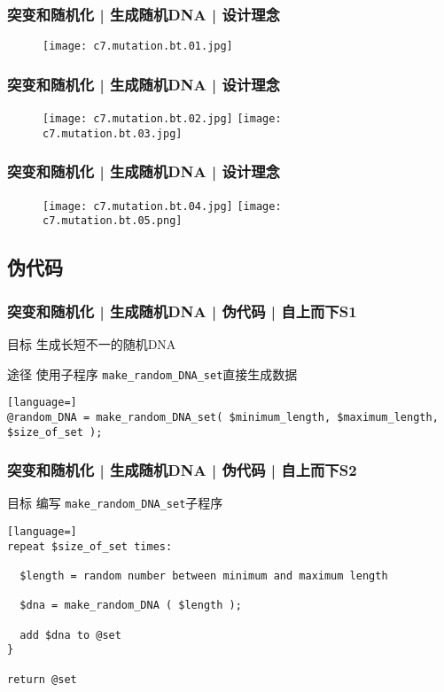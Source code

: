\begin{frame}
  \frametitle{突变和随机化 | 生成随机DNA | 设计理念}
  \begin{figure}
    \centering
    \texttt{[image: c7.mutation.bt.01.jpg]}
  \end{figure}
\end{frame}

\begin{frame}
  \frametitle{突变和随机化 | 生成随机DNA | 设计理念}
  \begin{figure}
    \centering
    \texttt{[image: c7.mutation.bt.02.jpg]}
    \texttt{[image: c7.mutation.bt.03.jpg]}
  \end{figure}
\end{frame}

\begin{frame}
  \frametitle{突变和随机化 | 生成随机DNA | 设计理念}
  \begin{figure}
    \centering
    \texttt{[image: c7.mutation.bt.04.jpg]}
    \texttt{[image: c7.mutation.bt.05.png]}
  \end{figure}
\end{frame}

\subsection{伪代码}
\begin{frame}[fragile]
  \frametitle{突变和随机化 | 生成随机DNA | 伪代码 | 自上而下S1}
  \begin{block}{目标}
    生成长短不一的随机DNA
  \end{block}
  \pause
  \begin{block}{途径}
  使用子程序 \verb|make_random_DNA_set|直接生成数据
  \end{block}
  \pause
\begin{lstlisting}[language=]
@random_DNA = make_random_DNA_set( $minimum_length, $maximum_length, $size_of_set );
\end{lstlisting}
\end{frame}

\begin{frame}[fragile]
  \frametitle{突变和随机化 | 生成随机DNA | 伪代码 | 自上而下S2}
  \begin{block}{目标}
    编写 \verb|make_random_DNA_set|子程序
  \end{block}
  \pause
\begin{lstlisting}[language=]
repeat $size_of_set times:

  $length = random number between minimum and maximum length

  $dna = make_random_DNA ( $length );

  add $dna to @set
}

return @set
\end{lstlisting}
\end{frame}

